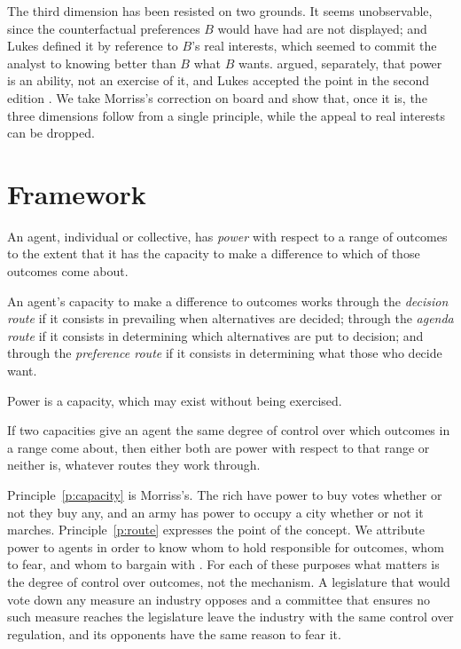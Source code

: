 \documentclass{situationist-preprint}
\begin{document}
The third dimension has been resisted on two grounds. It seems unobservable, since the counterfactual preferences $B$ would have had are not displayed; and Lukes defined it by reference to $B$'s real interests, which seemed to commit the analyst to knowing better than $B$ what $B$ wants. \citet{Morriss2002} argued, separately, that power is an ability, not an exercise of it, and Lukes accepted the point in the second edition \citep{Lukes2005}. We take Morriss's correction on board and show that, once it is, the three dimensions follow from a single principle, while the appeal to real interests can be dropped.

\section{Framework}

\begin{definition}[Power]\label{d:power}
An agent, individual or collective, has \emph{power} with respect to a range of outcomes to the extent that it has the capacity to make a difference to which of those outcomes come about.
\end{definition}

\begin{definition}[Routes]\label{d:routes}
An agent's capacity to make a difference to outcomes works through the \emph{decision route} if it consists in prevailing when alternatives are decided; through the \emph{agenda route} if it consists in determining which alternatives are put to decision; and through the \emph{preference route} if it consists in determining what those who decide want.
\end{definition}

\begin{principle}[Capacity]\label{p:capacity}
Power is a capacity, which may exist without being exercised.
\end{principle}

\begin{principle}\label{p:route}
If two capacities give an agent the same degree of control over which outcomes in a range come about, then either both are power with respect to that range or neither is, whatever routes they work through.
\end{principle}

Principle~\ref{p:capacity} is Morriss's. The rich have power to buy votes whether or not they buy any, and an army has power to occupy a city whether or not it marches. Principle~\ref{p:route} expresses the point of the concept. We attribute power to agents in order to know whom to hold responsible for outcomes, whom to fear, and whom to bargain with \citep{Morriss2002}. For each of these purposes what matters is the degree of control over outcomes, not the mechanism. A legislature that would vote down any measure an industry opposes and a committee that ensures no such measure reaches the legislature leave the industry with the same control over regulation, and its opponents have the same reason to fear it.
\end{document}
